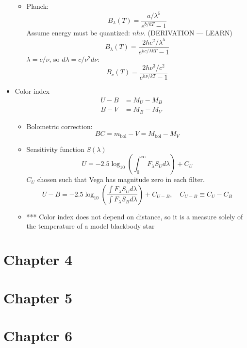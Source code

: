\documentclass[12pt]{article}
\begin{document}
\begin{itemize}
\begin{itemize}
\item Planck:
\begin{equation}
B_\lambda(T) = \frac{a/\lambda^5}{e^{b/kT} - 1}
\end{equation}
Assume energy must be quantized: $nh\nu$. (DERIVATION --- LEARN)
\begin{equation}
B_\lambda(T) = \frac{2hc^2/\lambda^5}{e^{hc/\lambda k T} - 1}
\end{equation}
$\lambda = c/\nu$, so $d\lambda = c/\nu^2 d\nu$:
\begin{equation}
B_\nu(T) = \frac{2 h \nu^3/c^2}{e^{h\nu/k T} - 1}
\end{equation}
\end{itemize}
\item Color index
\begin{align*}
U - B &= M_U - M_B \\
B - V &= M_B - M_V
\end{align*}
\begin{itemize}
\item Bolometric correction:
\begin{equation}
BC = m_\text{bol} - V = M_\text{bol} - M_V
\end{equation}
\item Sensitivity function $S(\lambda)$
\begin{equation}
U = -2.5\log_{10}\left(\int_0^\infty F_\lambda S_U d\lambda\right)+C_U
\end{equation}
$C_U$ chosen such that Vega has magnitude zero in each filter.
\begin{equation}
U - B = -2.5\log_{10}\left(\frac{\int F_\lambda S_U d\lambda}{\int F_\lambda S_B d\lambda}\right)+C_{U-B},\,\,\,\,\,\,C_{U-B} \equiv C_U - C_B
\end{equation}
\item *** Color index does not depend on distance, so it is a measure solely of the temperature of a model blackbody star
\end{itemize}
\end{itemize}

\section*{Chapter 4}

\section*{Chapter 5}

\section*{Chapter 6}
\end{document}
